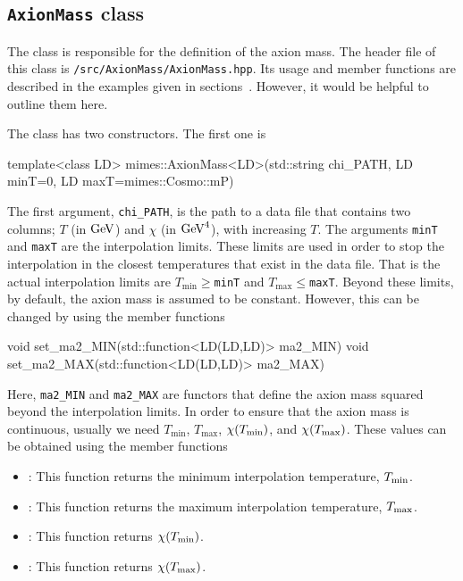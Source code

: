\documentclass[11pt,a4paper]{article}
\begin{document}
\subsection{{\tt AxionMass} class}
%
The  class is responsible for the definition of the axion mass. The header file of this class is {\tt \mimes/src/AxionMass/AxionMass.hpp}. Its usage and member functions are described in the examples given in sections~. However, it would be helpful to outline them here.

The class has two constructors. The first one is
%
\begin{cpp}
	template<class LD>
	mimes::AxionMass<LD>(std::string chi_PATH, LD minT=0, LD maxT=mimes::Cosmo::mP)
\end{cpp}
%
The first argument, {\tt chi\_PATH}, is the path to a data file that contains two columns; $T$ (in ${\rm GeV}$) and $\chi$ (in ${\rm GeV}^4$), with increasing $T$. The arguments {\tt minT} and {\tt maxT} are the interpolation limits. These limits are used in order to stop the interpolation in the closest temperatures that exist in the data file. That is the actual interpolation limits are $T_{\min}\geq${\tt minT} and $T_{\max}\leq${\tt maxT}. Beyond these limits, by default, the axion mass is assumed to be constant. However, this can be changed by using the member functions
%
\begin{cpp}
	void set_ma2_MIN(std::function<LD(LD,LD)> ma2_MIN)
	void set_ma2_MAX(std::function<LD(LD,LD)> ma2_MAX)
\end{cpp}
%
Here, {\tt ma2\_MIN} and {\tt ma2\_MAX} are functors that define the axion mass squared beyond the interpolation limits. In order to ensure that the axion mass is continuous, usually we need $T_{\min}$, $T_{\max}$, $\chi(T_{\rm min})$, and $\chi(T_{\rm max})$. These values can be obtained using the member functions
%
\begin{itemize}
	\item {}: This function returns the minimum interpolation temperature, $T_{\rm min}$. 
	\item {}: This function returns the maximum interpolation temperature, $T_{\rm max}$.
	\item {}: This function returns $\chi(T_{\rm min})$.
	\item {}: This function returns $\chi(T_{\rm max})$.
\end{itemize}
\end{document}

